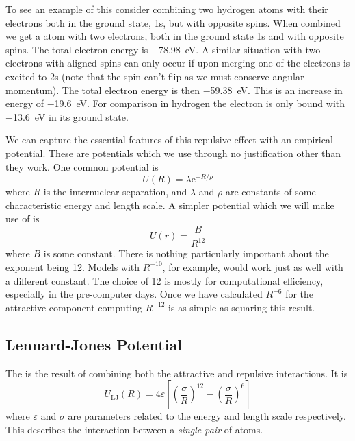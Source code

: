 \documentclass[fleqn]{NotesClass}
\newcommand*{\e}{\mathrm{e}}
\newcommand*{\LJ}{\mathrm{LJ}}
\begin{document}
    To see an example of this consider combining two hydrogen atoms with their electrons both in the ground state, 1s, but with opposite spins.
    When combined we get a  atom with two electrons, both in the ground state 1s and with opposite spins.
    The total electron energy is \qty{-78.98}{\electronvolt}.
    A similar situation with two electrons with aligned spins can only occur if upon merging one of the electrons is excited to 2s (note that the spin can't flip as we must conserve angular momentum).
    The total electron energy is then \qty{-59.38}{\electronvolt}.
    This is an increase in energy of \qty{-19.6}{\electronvolt}.
    For comparison in hydrogen the electron is only bound with \qty{-13.6}{\electronvolt} in its ground state.
    
    We can capture the essential features of this repulsive effect with an empirical potential.
    These are potentials which we use through no justification other than they work.
    One common potential is
    \begin{equation}
        U(R) = \lambda\e^{-R/\rho}
    \end{equation}
    where \(R\) is the internuclear separation, and \(\lambda\) and \(\rho\) are constants of some characteristic energy and length scale.
    A simpler potential which we will make use of is
    \begin{equation}
        U(r) = \frac{B}{R^{12}}
    \end{equation}
    where \(B\) is some constant.
    There is nothing particularly important about the exponent being 12.
    Models with \(R^{-10}\), for example, would work just as well with a different constant.
    The choice of 12 is mostly for computational efficiency, especially in the pre-computer days.
    Once we have calculated \(R^{-6}\) for the attractive component computing \(R^{-12}\) is as simple as squaring this result.
    
    \subsection{Lennard-Jones Potential}
    The  is the result of combining both the attractive and repulsive interactions.
    It is
    \begin{equation}
        U_{\LJ}(R) = 4\varepsilon\left[ \left( \frac{\sigma}{R} \right)^{12} - \left( \frac{\sigma}{R} \right)^{6} \right]
    \end{equation}
    where \(\varepsilon\) and \(\sigma\) are parameters related to the energy and length scale respectively.
    This describes the interaction between a \emph{single pair} of atoms.
    
\end{document}
